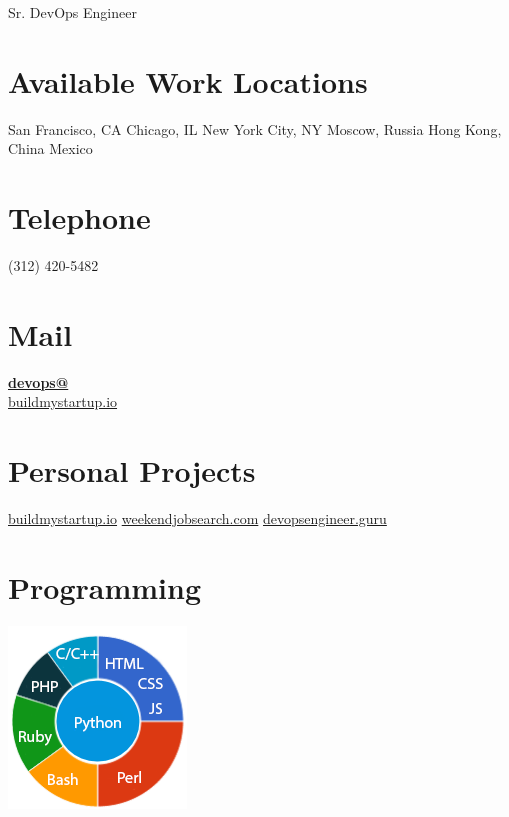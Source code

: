 \documentclass[]{friggeri-cv}
\begin{document}
      {Sr. DevOps Engineer}
      

\begin{aside}
  \section{Available Work Locations}
    San Francisco, CA
    Chicago, IL
    New York City, NY
    Moscow, Russia
    Hong Kong, China
    Mexico
    ~
  \section{Telephone}
    (312) 420-5482
    

  \section{Mail}
    \href{mailto:devops@buildmystartup.io}{\textbf{devops@}\\buildmystartup.io}
    ~
  \section{Personal Projects}
    \href{http://www.buildmystartup.io}{buildmystartup.io}
  \href{http://www.weekendjobsearch.com}{weekendjobsearch.com}
  \href{http://www.devopsengineer.guru}{devopsengineer.guru}
    ~
  \section{Programming}
    \includegraphics[scale=0.62]{img/programming_new.png}
    ~

\end{aside}
\end{document}
